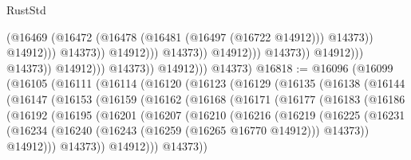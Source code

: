 \begin{lexlean}{RustStd}
\begin{coremodule}
                                                            (@16469
                                                              (@16472
                                                                (@16478
                                                                  (@16481 (@16497 (@16722 @14912)))
                                                                  @14373))
                                                              @14912)))
                                                        @14373))
                                                    @14912)))
                                              @14373))
                                          @14912)))
                                    @14373))
                                @14912)))
                          @14373))
                      @14912)))
                @14373))
            @14912)))
      @14373)
@16818 := @16096
    (@16099
      (@16105
        (@16111
          (@16114
            (@16120
              (@16123
                (@16129
                  (@16135
                    (@16138
                      (@16144
                        (@16147
                          (@16153
                            (@16159
                              (@16162
                                (@16168
                                  (@16171
                                    (@16177
                                      (@16183
                                        (@16186
                                          (@16192
                                            (@16195
                                              (@16201
                                                (@16207
                                                  (@16210
                                                    (@16216
                                                      (@16219
                                                        (@16225
                                                          (@16231
                                                            (@16234
                                                              (@16240
                                                                (@16243
                                                                  (@16259 (@16265 @16770 @14912)))
                                                                @14373))
                                                            @14912)))
                                                      @14373))
                                                  @14912)))
                                            @14373))

\end{coremodule}
\end{lexlean}
